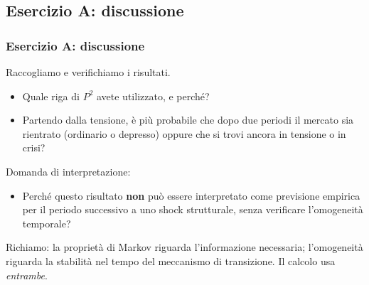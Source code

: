 \documentclass[handout]{beamer}%
\newenvironment{stepitemize}{\begin{itemize}[<+->]}{\end{itemize} }
\providecommand{\QTR}[2]{\csname #1\endcsname{#2}}
\begin{document}


\subsection{Esercizio A: discussione}%

\begin{frame}%
%

\frametitle{Esercizio A: discussione}%
%

%


Raccogliamo e verifichiamo i risultati.

\medskip

\begin{stepitemize}


\item Quale riga di $P^{2}$ avete utilizzato, e perch\'{e}?

\item Partendo dalla tensione, \`{e} pi\`{u} probabile che dopo due periodi il
mercato sia rientrato (ordinario o depresso) oppure che si trovi ancora in
tensione o in crisi?
\end{stepitemize}

\medskip

Domanda di interpretazione:

\begin{stepitemize}
\item Perch\'{e} questo risultato \textbf{non} pu\`{o} essere interpretato
come previsione empirica per il periodo successivo a uno shock strutturale,
senza verificare l'omogeneit\`{a} temporale?
\end{stepitemize}

\medskip

\begin{center}
{\small Richiamo: la propriet\`{a} di Markov riguarda l'informazione
necessaria; l'omogeneit\`{a} riguarda la stabilit\`{a} nel tempo del
meccanismo di transizione. Il calcolo usa \emph{entrambe}.}
\end{center}%

\transboxout
\end{frame}%
\end{document}

